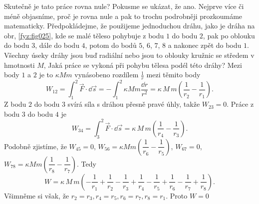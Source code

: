     Skutečně je tato práce rovna nule? Pokusme se ukázat, že ano. Nejprve více či méně objasníme, 
    proč je rovna nule a pak to trochu podrobněji prozkoumáme matematicky. Předpokládejme, že 
    použijeme jednoduchou dráhu, jako je dráha na obr, \ref{fyz:fig025}, kde se malé těleso 
    pohybuje z bodu \(1\) do bodu \(2\), pak po oblouku do bodu \(3\), dále do bodu \(4\), potom do 
    bodů \(5\), \(6\), \(7\), \(8\)  a nakonec zpět do bodu \(1\). Všechny úseky dráhy jsou buď 
    radiální nebo jsou to oblouky kružnic se středem v hmotnosti \(M\), Jaká práce se vykoná při 
    pohybu tělesa podél této dráhy? Mezi body \(1\) a \(2\) je to \(\kappa Mm\) vynásobeno rozdílem 
    \(\frac{1}{r}\) mezi těmito body
    \begin{equation*}
      W_{12} = \int_{1}^{2}\vec{F}\cdot\dd{\vec{s}} = 
             - \int_{1}^{2}\kappa Mm\frac{\dd{r}}{r^2}
             = \kappa\,M\,m\left(\dfrac{1}{r_2} - \dfrac{1}{r_1}\right).
    \end{equation*} 
    Z bodu \(2\) do bodu \(3\) svírá síla s dráhou přesně pravé úhly, takže \(W_{23} = 0\). Práce z 
    bodu \(3\) do bodu \(4\) je
    \begin{equation*}
      W_{34} = \int_{3}^{2}\vec{F}\cdot\dd{\vec{s}}
             = \kappa\,M\,m\left(\dfrac{1}{r_4} - \dfrac{1}{r_3}\right).
    \end{equation*} 
    Podobně zjistíme, že \(W_{45} = 0\), \(W_{56} = \kappa Mm\left(\dfrac{1}{r_6} - 
    \dfrac{1}{r_5}\right)\), \(W_{67}=0\), \(W_{78} = \kappa Mm\left(\dfrac{1}{r_8} - 
    \dfrac{1}{r_7}\right)\). Tedy
    \begin{equation*}
      W = \kappa\,M\,m\left(-\dfrac{1}{r_1} + \dfrac{1}{r_2} 
                            -\dfrac{1}{r_3} + \dfrac{1}{r_4}
                            -\dfrac{1}{r_5} + \dfrac{1}{r_6}
                            -\dfrac{1}{r_7} + \dfrac{1}{r_8}\right).
    \end{equation*} 
    Všimněme si však, že \(r_2 = r_3, r_4 = r_5, r_6 = r_7, r_8 = r_1\). Proto \(W = 0\)
    
